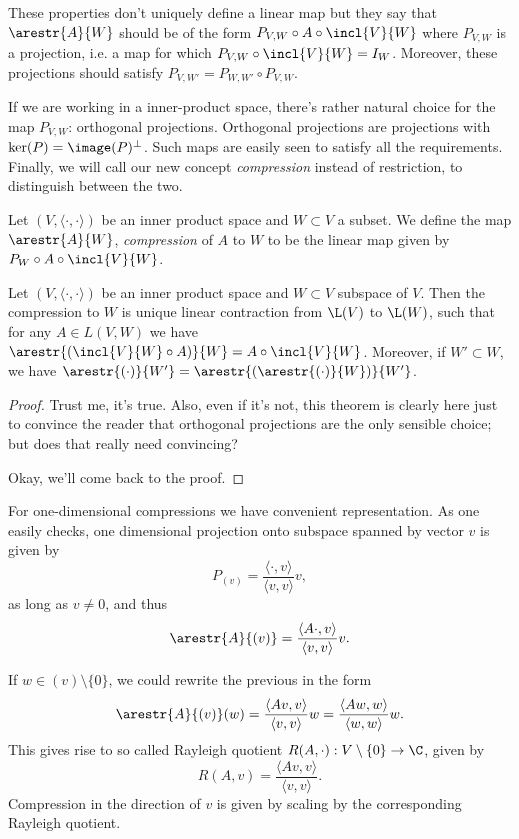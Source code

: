 These properties don't uniquely define a linear map but they say that $\arestr{A}{W}$ should be of the form $P_{V, W} \circ A \circ \incl{V}{W}$ where $P_{V, W}$ is a projection, i.e. a map for which $P_{V, W} \circ \incl{V}{W} = I_{W}$. Moreover, these projections should satisfy $P_{V, W'} = P_{W, W'} \circ P_{V, W}$.

If we are working in a inner-product space, there's rather natural choice for the map $P_{V, W}$: orthogonal projections. Orthogonal projections are projections with $\ker(P) = \image(P)^{\perp}$. Such maps are easily seen to satisfy all the requirements. Finally, we will call our new concept \textit{compression} instead of restriction, to distinguish between the two.

\begin{maar}
	Let $(V, \langle \cdot, \cdot \rangle )$ be an inner product space and $W \subset V$ a subset. We define the map $\arestr{A}{W}$, \textit{compression} of $A$ to $W$ to be the linear map given by $P_{W} \circ A \circ \incl{V}{W}$.
\end{maar}

\begin{lause}
	Let $(V, \langle \cdot, \cdot \rangle)$ be an inner product space and $W \subset V$ subspace of $V$. Then the compression to $W$ is unique linear contraction from $\L(V)$ to $\L(W)$, such that for any $A \in L(V, W)$ we have $\arestr{(\incl{V}{W} \circ A)}{W} = A \circ \incl{V}{W}$. Moreover, if $W' \subset W$, we have $\arestr{(\cdot)}{W'} = \arestr{(\arestr{(\cdot)}{W})}{W'}$.
\end{lause}
\begin{proof}
	Trust me, it's true. Also, even if it's not, this theorem is clearly here just to convince the reader that orthogonal projections are the only sensible choice; but does that really need convincing?

	Okay, we'll come back to the proof.
\end{proof}

For one-dimensional compressions we have convenient representation. As one easily checks, one dimensional projection onto subspace spanned by vector $v$ is given by
\[
	P_{(v)} = \frac{\langle \cdot, v \rangle}{\langle v, v \rangle} v,
\]
as long as $v \neq 0$, and thus
\[
	\arestr{A}{(v)} = \frac{\langle A \cdot, v \rangle}{\langle v, v \rangle} v.
\]

If $w \in (v) \setminus \{0\}$, we could rewrite the previous in the form
\[
	\arestr{A}{(v)}(w) = \frac{\langle A v, v\rangle}{\langle v, v\rangle} w = \frac{\langle A w, w\rangle}{\langle w, w \rangle} w.
\]
This gives rise to so called Rayleigh quotient $R(A, \cdot) : V \setminus \{0\} \to \C$, given by
\[
	R(A, v) = \frac{\langle A v, v \rangle}{\langle v, v \rangle}.
\]
Compression in the direction of $v$ is given by scaling by the corresponding Rayleigh quotient.

